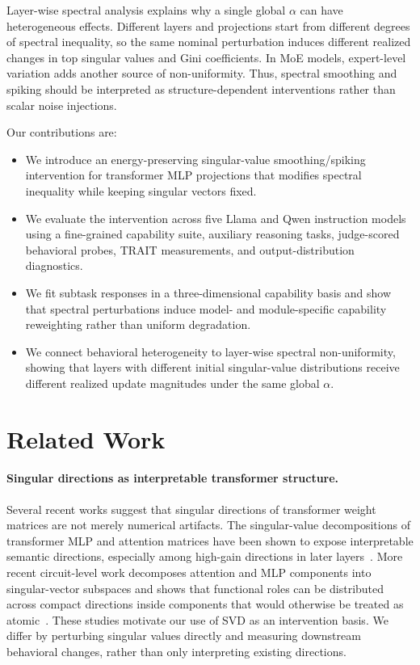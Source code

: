 Layer-wise spectral analysis explains why a single global \(\alpha\) can have heterogeneous effects. Different layers and projections start from different degrees of spectral inequality, so the same nominal perturbation induces different realized changes in top singular values and Gini coefficients. In MoE models, expert-level variation adds another source of non-uniformity. Thus, spectral smoothing and spiking should be interpreted as structure-dependent interventions rather than scalar noise injections.

Our contributions are:
\begin{itemize}
    \item We introduce an energy-preserving singular-value smoothing/spiking intervention for transformer MLP projections that modifies spectral inequality while keeping singular vectors fixed.
    \item We evaluate the intervention across five Llama and Qwen instruction models using a fine-grained capability suite, auxiliary reasoning tasks, judge-scored behavioral probes, TRAIT measurements, and output-distribution diagnostics.
    \item We fit subtask responses in a three-dimensional capability basis and show that spectral perturbations induce model- and module-specific capability reweighting rather than uniform degradation.
    \item We connect behavioral heterogeneity to layer-wise spectral non-uniformity, showing that layers with different initial singular-value distributions receive different realized update magnitudes under the same global \(\alpha\).
\end{itemize}

\section{Related Work}

\paragraph{Singular directions as interpretable transformer structure.}
Several recent works suggest that singular directions of transformer weight matrices are not merely numerical artifacts. The singular-value decompositions of transformer MLP and attention matrices have been shown to expose interpretable semantic directions, especially among high-gain directions in later layers~\citep{svd_transformer_interpretable}. More recent circuit-level work decomposes attention and MLP components into singular-vector subspaces and shows that functional roles can be distributed across compact directions inside components that would otherwise be treated as atomic~\citep{beyond_components_svd_circuits}. These studies motivate our use of SVD as an intervention basis. We differ by perturbing singular values directly and measuring downstream behavioral changes, rather than only interpreting existing directions.

